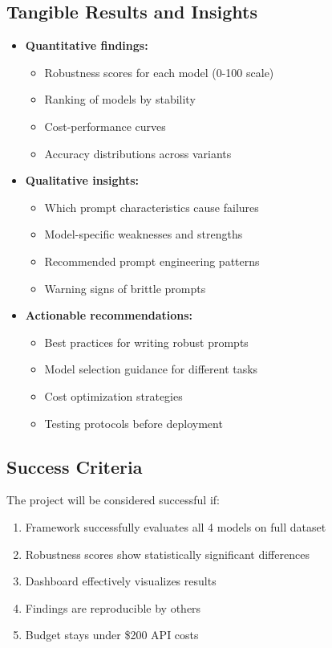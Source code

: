 \documentclass[11pt,a4paper]{article}
\begin{document}
\subsection{Tangible Results and Insights}

\begin{itemize}[leftmargin=*]
    \item \textbf{Quantitative findings:}
    \begin{itemize}
        \item Robustness scores for each model (0-100 scale)
        \item Ranking of models by stability
        \item Cost-performance curves
        \item Accuracy distributions across variants
    \end{itemize}
    
    \item \textbf{Qualitative insights:}
    \begin{itemize}
        \item Which prompt characteristics cause failures
        \item Model-specific weaknesses and strengths
        \item Recommended prompt engineering patterns
        \item Warning signs of brittle prompts
    \end{itemize}
    
    \item \textbf{Actionable recommendations:}
    \begin{itemize}
        \item Best practices for writing robust prompts
        \item Model selection guidance for different tasks
        \item Cost optimization strategies
        \item Testing protocols before deployment
    \end{itemize}
\end{itemize}

\subsection{Success Criteria}

The project will be considered successful if:

\begin{enumerate}[leftmargin=*]
    \item Framework successfully evaluates all 4 models on full dataset
    \item Robustness scores show statistically significant differences
    \item Dashboard effectively visualizes results
    \item Findings are reproducible by others
    \item Budget stays under \$200 API costs
\end{enumerate}
\end{document}
